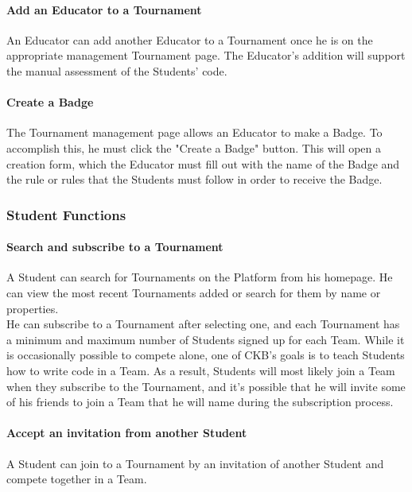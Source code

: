 \paragraph{Add an Educator to a Tournament}
An Educator can add another Educator to a Tournament once he is on the appropriate management Tournament page. The Educator's addition will support the manual assessment of the Students' code.
\paragraph{Create a Badge}
The Tournament management page allows an Educator to make a Badge. To accomplish this, he must click the "Create a Badge" button. This will open a creation form, which the Educator must fill out with the name of the Badge and the rule 
or rules that the Students must follow in order to receive the Badge.

\subsubsection{Student Functions}
\paragraph{Search and subscribe to a Tournament}
A Student can search for Tournaments on the Platform from his homepage. He can view the most recent Tournaments added or search for them by name or properties.\\
He can subscribe to a Tournament after selecting one, and each Tournament has a minimum and maximum number of Students signed up for each Team. While it is occasionally possible to compete alone, one of CKB's goals is to teach 
Students how to write code in a Team. As a result, Students will most likely join a Team when they subscribe to the Tournament, and it's possible that he will invite some of his friends to join a Team that he will name during the 
subscription process.
\newpage
\paragraph{Accept an invitation from another Student}
A Student can join to a Tournament by an invitation of another Student and compete together in a Team.
